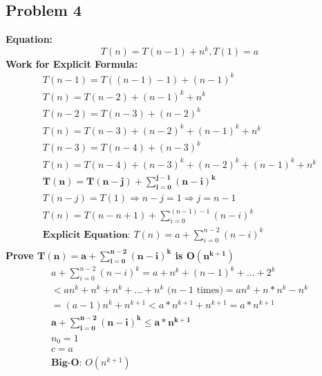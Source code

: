 \documentclass[a4paper,11pt]{article}
\begin{document}
	\subsection{Problem 4}
	\textbf{Equation:}\\
	\begin{equation*}
		T(n)=T(n-1)+n^k,T(1)=a
	\end{equation*}
	\textbf{Work for Explicit Formula:}\\
	\begin{gather*}
		T(n-1) = T((n-1)-1)+(n-1)^k\\
		T(n)=T(n-2)+(n-1)^k+n^k\\
		T(n-2) = T(n-3)+(n-2)^k\\
		T(n)=T(n-3)+(n-2)^k+(n-1)^k+n^k\\
		T(n-3) = T(n-4)+(n-3)^k\\
		T(n)=T(n-4)+(n-3)^k+(n-2)^k+(n-1)^k+n^k\\
		\mathbf{T(n)=T(n-j)+\sum^{j-1}_{i=0}(n-i)^k}\\
		T(n-j)=T(1)\Rightarrow n-j=1\Rightarrow j=n-1\\
		T(n)=T(n-n+1)+\sum^{(n-1)-1}_{i=0}(n-i)^k\\
		\textbf{Explicit Equation: }T(n)=a+\sum^{n-2}_{i=0}(n-i)^k\\
	\end{gather*}
	\textbf{Prove $\mathbf{T(n)=a+\sum^{n-2}_{i=0}(n-i)^k}$ is $\mathbf{O(n^{k+1})}$}
	\begin{gather*}
		a+\sum^{n-2}_{i=0}(n-i)^k=a+n^k+(n-1)^k+...+2^k\\
		< an^k+n^k+n^k+...+n^k \text{ ($n-1$ times)} = an^k + n*n^k -n^k\\
		= (a-1)n^k + n^{k+1} < a*n^{k+1}+n^{k+1}=a*n^{k+1}\\
		\mathbf{a+\sum^{n-2}_{i=0}(n-i)^k \leq a*n^{k+1}}\\
		n_0 = 1\\
		c = a\\
		\textbf{Big-O: }O(n^{k+1})\\
	\end{gather*}
\end{document}
